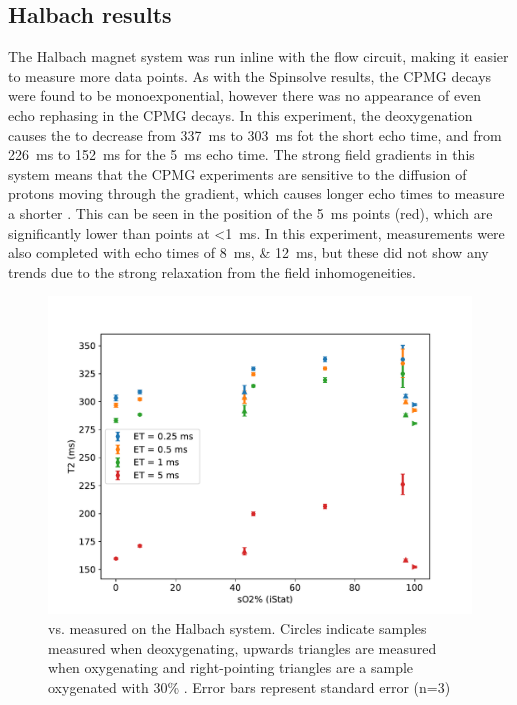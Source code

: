 \subsection{Halbach results}


The Halbach magnet system was run inline with the flow circuit, making it easier to measure more data points.
As with the Spinsolve results, the CPMG decays were found to be monoexponential, however there was no appearance of even echo rephasing in the CPMG decays.
In this experiment, the deoxygenation causes the \Ttwo to decrease from \SI{337}{ms} to \SI{303}{ms} fot the short echo time, and from \SI{226}{ms} to \SI{152}{ms} for the \SI{5}{ms} echo time.
The strong field gradients in this system means that the CPMG experiments are sensitive to the diffusion of protons moving through the gradient, which causes longer echo times to measure a shorter \Ttwo.
This can be seen in the position of the \SI{5}{ms} points (red), which are significantly lower than points at \textless\SI{1}{ms}.
In this experiment, measurements were also completed with echo times of \SIlist{8;12}{ms}, but these did not show any trends due to the strong relaxation from the field inhomogeneities.

\begin{figure}[ht]
\centering
\includegraphics[width=\textwidth]{figures/stoppedflow/halbachT2SO2.pdf}
\caption[Stopped flow \Ttwo vs. \SOtwo measured on the Halbach system]{\Ttwo vs. \SOtwo measured on the Halbach system. Circles indicate samples measured when deoxygenating, upwards triangles are measured when oxygenating and right-pointing triangles are a sample oxygenated with 30\% \Otwo. Error bars represent standard error (n=3)}
\label{fig:sf-halbachT2SO2}
\end{figure}

